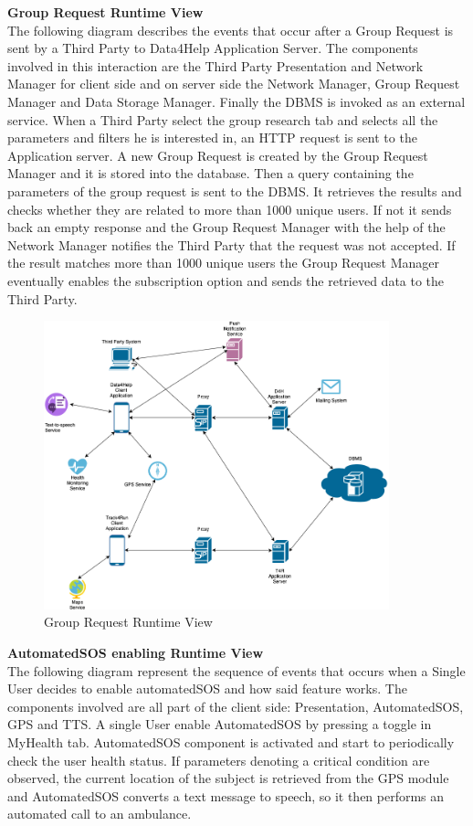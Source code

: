 \documentclass[titlepage]{article}
\begin{document}
{\bf Group Request Runtime View }\\ 
The following diagram describes the events that occur after a Group Request is sent by a Third Party to Data4Help Application Server. The components involved in this interaction are the Third Party Presentation and Network Manager for client side and  on server side the Network Manager, Group Request Manager and Data Storage Manager. Finally the DBMS is invoked as an external service.
When a Third Party select the group research tab and selects all the parameters and filters he is interested in, an HTTP request is sent to the Application server. A new Group Request is created by the Group Request Manager and it is stored into the database. Then a query containing the parameters of the group request is sent to the DBMS. It retrieves the results and checks whether they are related to more than 1000 unique users. If not it sends back an empty response and the Group Request Manager with the help of the Network Manager notifies the Third Party that the request was not accepted. If the result matches more than 1000 unique users the Group Request Manager eventually enables the subscription option and sends the retrieved data to the Third Party.

\begin{figure}[H]
	\center
  	\includegraphics[width=10cm]{Overview.png} %
  	\caption{Group Request Runtime View}
 	\label{fig:GRPREQ}
\end{figure}


{\bf AutomatedSOS enabling Runtime View }\\ 
The following diagram represent the sequence of events that occurs when a Single User decides to enable automatedSOS and how said feature works.
The components involved are all part of the client side: Presentation, AutomatedSOS, GPS and TTS. A single User enable AutomatedSOS by pressing a toggle in MyHealth tab.
AutomatedSOS component is activated and start to periodically check the user health status. If parameters denoting a critical condition are observed, the current location of the subject is retrieved from the GPS module and AutomatedSOS converts a text message to speech, so it then performs an automated call to an ambulance.
\end{document}
